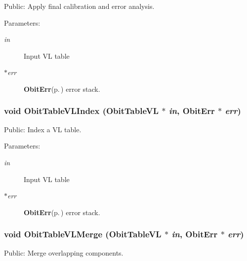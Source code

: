 Public: Apply final calibration and error analysis. 

\begin{Desc}
\item[Parameters:]
\begin{description}
\item[{\em in}]Input VL table \item[{\em $\ast$err}]{\bf Obit\-Err}{\rm (p.\,\pageref{structObitErr})} error stack. \end{description}
\end{Desc}
\subsubsection{\setlength{\rightskip}{0pt plus 5cm}void Obit\-Table\-VLIndex ({\bf Obit\-Table\-VL} $\ast$ {\em in}, {\bf Obit\-Err} $\ast$ {\em err})}\label{ObitTableVLUtil_8c_a9}


Public: Index a VL table. 

\begin{Desc}
\item[Parameters:]
\begin{description}
\item[{\em in}]Input VL table \item[{\em $\ast$err}]{\bf Obit\-Err}{\rm (p.\,\pageref{structObitErr})} error stack. \end{description}
\end{Desc}
\subsubsection{\setlength{\rightskip}{0pt plus 5cm}void Obit\-Table\-VLMerge ({\bf Obit\-Table\-VL} $\ast$ {\em in}, {\bf Obit\-Err} $\ast$ {\em err})}\label{ObitTableVLUtil_8c_a12}


Public: Merge overlapping components. 

